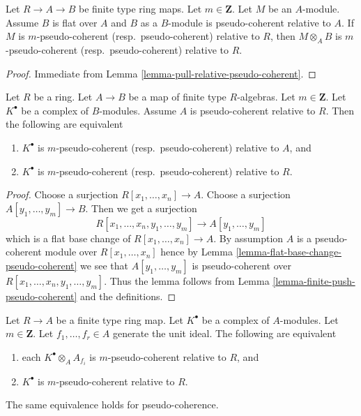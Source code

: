 \begin{lemma}
\label{lemma-pull-relative-pseudo-coherent-module}
Let $R \to A \to B$ be finite type ring maps.
Let $m \in \mathbf{Z}$. Let $M$ be an $A$-module.
Assume $B$ is flat over $A$ and $B$ as a $B$-module is
pseudo-coherent relative to $A$.
If $M$ is $m$-pseudo-coherent (resp.\ pseudo-coherent)
relative to $R$, then $M \otimes_A B$ is
$m$-pseudo-coherent (resp.\ pseudo-coherent) relative to $R$.
\end{lemma}

\begin{proof}
Immediate from
Lemma \ref{lemma-pull-relative-pseudo-coherent}.
\end{proof}

\begin{lemma}
\label{lemma-composition-relative-pseudo-coherent}
Let $R$ be a ring. Let $A \to B$ be a map of finite type $R$-algebras.
Let $m \in \mathbf{Z}$. Let $K^\bullet$ be a complex of $B$-modules.
Assume $A$ is pseudo-coherent relative to $R$. Then the following are
equivalent
\begin{enumerate}
\item $K^\bullet$ is $m$-pseudo-coherent (resp.\ pseudo-coherent)
relative to $A$, and
\item $K^\bullet$ is $m$-pseudo-coherent (resp.\ pseudo-coherent)
relative to $R$.
\end{enumerate}
\end{lemma}

\begin{proof}
Choose a surjection $R[x_1, \ldots, x_n] \to A$.
Choose a surjection $A[y_1, \ldots, y_m] \to B$.
Then we get a surjection
$$
R[x_1, \ldots, x_n, y_1, \ldots, y_m] \to A[y_1, \ldots, y_m]
$$
which is a flat base change of $R[x_1, \ldots, x_n] \to A$.
By assumption $A$ is a pseudo-coherent module over $R[x_1, \ldots, x_n]$
hence by
Lemma \ref{lemma-flat-base-change-pseudo-coherent}
we see that $A[y_1, \ldots, y_m]$ is pseudo-coherent over
$R[x_1, \ldots, x_n, y_1, \ldots, y_m]$. Thus the lemma follows from
Lemma \ref{lemma-finite-push-pseudo-coherent}
and the definitions.
\end{proof}

\begin{lemma}
\label{lemma-glue-relative-pseudo-coherent}
Let $R \to A$ be a finite type ring map.
Let $K^\bullet$ be a complex of $A$-modules.
Let $m \in \mathbf{Z}$.
Let $f_1, \ldots, f_r \in A$ generate the unit ideal.
The following are equivalent
\begin{enumerate}
\item each $K^\bullet \otimes_A A_{f_i}$ is
$m$-pseudo-coherent relative to $R$, and
\item $K^\bullet$ is $m$-pseudo-coherent relative to $R$.
\end{enumerate}
The same equivalence holds for pseudo-coherence.
\end{lemma}

